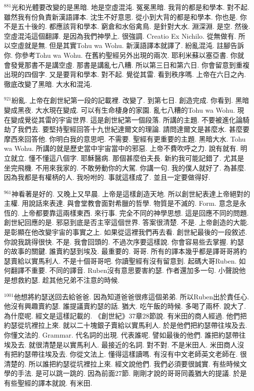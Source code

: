 \documentclass{book}
\begin{document}
$^{881}$光和光體要改變的是黑暗.
地是空虛混沌.
冤冕黑暗.
我背的都是和學本.
對不起.
雖然我有份負責新漢語譯本.
沈生不好意思.
從小到大背的都是和學本.
你也是.
你不是五十後的.
都應該背和學本.
窮倉和水俗禽鳥.
是針對大水.
淵深淵.
是空.
然後.
空虛混沌這個翻譯.
是因為我們神學上.
很強調.
Creatio Ex Nichilo.
從無做有.
所以空虛就是無.
但是其實Tohu wa Wohu.
新漢語譯本就譯了.
紛亂混沌.
註腳告訴你.
你參考Tohu wa Wohu.
在舊約聖經另外出現的兩次.
耶利米蘇以塞亞書.
你就會發覺那書不是講空虛.
那書是講亂七八糟.
所以第三日和第六日.
你會留意到重複出現的四個字.
又是要背和學本.
對不起.
覺從其雷.
看到秩序嗎.
上帝在六日之內.
徹底改變了黑暗.
大水和混沌.

$^{921}$紛亂.
上帝在創世紀第一段的記載裡.
改變了.
到第七日.
創造完成.
你看到.
黑暗變成黑夜.
大水現在變成.
可以有生命棲身的家園.
亂七八糟的Tohu wa Wohu.
現在變成覺從其雷的宇宙世界.
這是創世紀第一個段落.
所講的主題.
不要被進化論騎劫了我們去.
要堅持聖經回答十九世紀達爾文的理論.
請問達爾文是甚麼水.
甚麼要摩西來回答他.
你明白我的意思吧.
不需要.
聖經有更重要的主題.
黑暗大水.
Tohu wa Wohu.
所講的就是歷史當中宇宙當中的邪惡.
上帝不費吹呼之力.
說有就有.
明立就立.
懂不懂這八個字.
耶穌醫病.
那個甚麼伯夫長.
新約我可能記錯了.
尤其是坐完飛機.
不用來我家的.
不敢勞動你的大駕.
你講一句.
我的僕人就好了.
為甚麼.
因為我都是有權柄的人.
我吩咐的.
事就這樣成了.
並且一定要做得好.

$^{961}$神看著是好的.
又晚上又早晨.
上帝是這樣創造天地.
所以創世紀表達上帝絕對的主權.
用說話來表達.
與會堂教會面對希臘的哲學.
物質是不滅的.
Form.
意念是永恆的.
上帝都要靠這兩樣東西.
來行事.
完全不同的神學思想.
這是回應不同的問題.
創世紀回應的是.
邪惡到底是否主宰這個世界.
答案很清楚.
不是.
上帝創造的大能.
是彰顯在他改變宇宙的事實之上.
如果從這裡我們再去看.
創世紀最後的一段敘述.
你說我跳得很快.
不是.
我會回頭的.
不過次序要這樣說.
你會容易些去掌握.
約瑟的故事的關鍵.
誰賣約瑟到埃及.
最重要的.
哥哥.
所有的譯本幾乎都是譯哥哥將約瑟賣給以實馬利人.
不是十個哥哥吧.
你讀聖經有沒有留意到.
起碼大哥Ruben.
如何翻譯不重要.
不同的譯音.
Ruben沒有意思要害約瑟.
作者還加多一句.
小聲說他是想救約瑟.
趁其他兄弟不注意的時候.

$^{1001}$他想將約瑟送回去給爸爸.
因為知道爸爸很疼這個弟弟.
所以Ruben出於責任心.
他沒有興趣賣約瑟.
誰提議賣約瑟的話.
猶大.
吃午飯的時候.
多喝了兩杯.
說大了.
為什麼呢.
經文是這樣記載的.
《創世紀》37章28節說.
有米田的商人經過.
他們把約瑟從坑裡拉上來.
就以二十塊銀子賣給以實馬利人.
於是他們把約瑟帶往埃及去.
你懂文法的.
Grammar.
代名詞的出現.
代表誰呢.
譬如最後的他們.
誰把約瑟帶往埃及去.
就很清楚是以實馬利人.
最接近的名詞.
對不對.
不是米田人.
米田商人沒有把約瑟帶往埃及去.
你從文法上.
懂得這樣讀嗎.
有沒有中文老師英文老師在.
很清楚的.
所以誰把約瑟從坑裡拉上來.
經文說他們.
我們必須要很誠實.
有些時候文學的手法.
是可以跳一跳的.
因為前面27節.
剛剛才說的哥哥同義猶大的提議.
於是有些聖經的譯本就說.
有米田.
\end{document}
